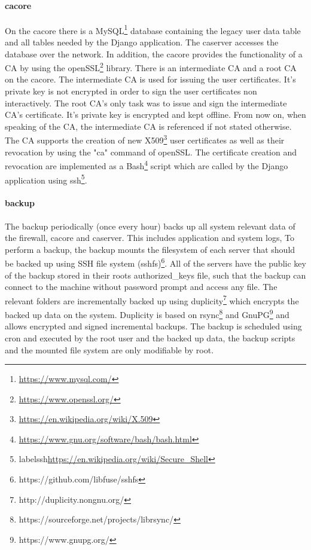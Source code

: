 \documentclass[english]{article}
\begin{document}
\paragraph{cacore}
On the cacore there is a MySQL\footnote{\url{https://www.mysql.com/}} database containing the legacy user data table and all tables needed by the Django application. The caserver accesses the database over the network. In addition, the cacore provides the functionality of a CA by using the openSSL\footnote{\label{openssl}\url{https://www.openssl.org/}} library.
There is an intermediate CA and a root CA on the cacore. The intermediate CA is used for issuing the user certificates. It's private key is not encrypted in order to sign the user certificates non interactively. The root CA's only task was to issue and sign the intermediate CA's certificate. It's private key is encrypted and kept offline. From now on, when speaking of the CA, the intermediate CA is referenced if not stated otherwise.
The CA supports the creation of new X509\footnote{\url{https://en.wikipedia.org/wiki/X.509}} user certificates as well as their revocation by using the "ca" command of openSSL. The certificate creation and revocation are implemented as a Bash\footnote{\url{https://www.gnu.org/software/bash/bash.html}} script which are called by the Django application using ssh\footnote{label{ssh}\url{https://en.wikipedia.org/wiki/Secure_Shell}}.

\paragraph{backup}

The backup periodically (once every hour) backs up all system relevant data of the firewall, cacore and caserver. This includes application and system logs,  To perform a backup, the backup mounts the filesystem of each server that should be backed up using SSH file system (sshfs)\footnote{https://github.com/libfuse/sshfs}. All of the servers have the public key of the backup stored in their roots authorized\_keys file, such that the backup can connect to the machine without password prompt and access any file. The relevant folders are incrementally backed up using duplicity\footnote{http://duplicity.nongnu.org/} which encrypts the backed up data on the system. Duplicity is based on rsync\footnote{https://sourceforge.net/projects/librsync/} and GnuPG\footnote{https://www.gnupg.org/} and allows encrypted and signed incremental backups. The backup is scheduled using cron and executed by the root user and the backed up data, the backup scripts and the mounted file system are only modifiable by root.
 
\end{document}
